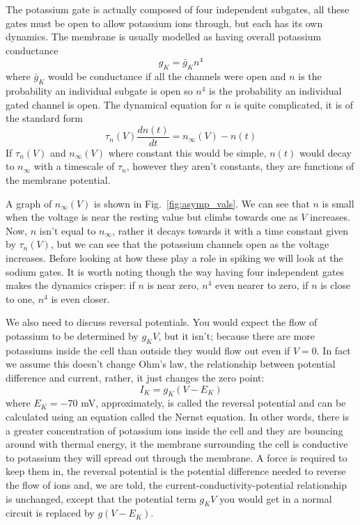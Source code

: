 \documentclass[11pt,a4paper]{scrartcl}
\begin{document}
The potassium gate is actually composed of four independent subgates,
all these gates must be open to allow potassium ions through, but each
has its own dynamics. The membrane is usually modelled as having
overall potassium conductance 
\begin{equation}
g_{K}=\bar{g}_Kn^4
\end{equation}
where $\bar{g}_K$ would be conductance if all the channels were open
and $n$ is the probability an individual subgate is open so $n^4$ is
the probability an individual gated channel is open. The dynamical equation for $n$ is quite complicated, it is of the standard form
\begin{equation}
\tau_n(V)\frac{dn(t)}{dt}=n_\infty(V)-n(t)
\end{equation}
If $\tau_n(V)$ and $n_\infty(V)$ where constant this would be simple,
$n(t)$ would decay to $n_\infty$ with a timescale of $\tau_n$, however
they aren't constants, they are functions of the membrane potential. 

A graph of $n_\infty(V)$ is shown in Fig.~\ref{fig:asymp_vals}. We can see that $n$ is
small when the voltage is near the resting value but climbs towards
one as $V$ increases. Now, $n$ isn't equal to $n_\infty$, rather it
decays towards it with a time constant given by $\tau_n(V)$, but we
can see that the potassium channels open as the voltage
increases. Before looking at how these play a role in spiking we will
look at the sodium gates. It is worth noting though the way having
four independent gates makes the dynamics crisper: if $n$ is near
zero, $n^4$ even nearer to zero, if $n$ is close to one, $n^4$ is even
closer. 

We also need to discuss reversal potentials. You would expect
the flow of potassium to be determined by $g_KV$, but it isn't; because
there are more potassiums inside the cell than outside they would flow
out even if $V=0$. In fact we assume this doesn't change Ohm's law,
the relationship between potential difference and current, rather, it
just changes the zero point:
\begin{equation}
I_K=g_K(V-E_K)
\end{equation}
where $E_K=-70$ mV, approximately, is called the reversal potential
and can be calculated using an equation called the Nernst equation. In
other words, there is a greater concentration of potassium ions inside
the cell and they are bouncing around with thermal energy, it the
membrane surrounding the cell is conductive to potassium they will
spread out through the membrane. A force is required to keep them in,
the reversal potential is the potential difference needed to reverse
the flow of ions and, we are told, the current-conductivity-potential
relationship is unchanged, except that the potential term $g_KV$ you
would get in a normal circuit is replaced by $g(V-E_K)$.
\end{document}

